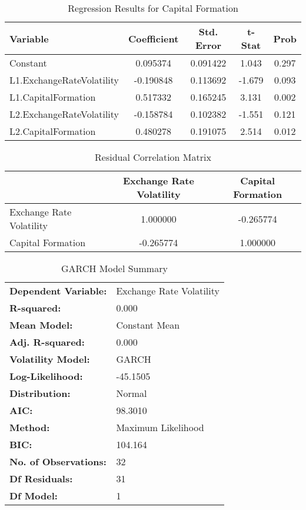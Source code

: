 \documentclass{article} %
\begin{document}
\begin{table}[h]
    \centering
    \caption{Regression Results for Capital Formation}
    \begin{tabular}{lcccc}
        \toprule
        \textbf{Variable} & \textbf{Coefficient} & \textbf{Std. Error} & \textbf{t-Stat} & \textbf{Prob} \\
        \midrule
        Constant & 0.095374 & 0.091422 & 1.043 & 0.297 \\
        L1.ExchangeRateVolatility & -0.190848 & 0.113692 & -1.679 & 0.093 \\
        L1.CapitalFormation & 0.517332 & 0.165245 & 3.131 & 0.002 \\
        L2.ExchangeRateVolatility & -0.158784 & 0.102382 & -1.551 & 0.121 \\
        L2.CapitalFormation & 0.480278 & 0.191075 & 2.514 & 0.012 \\
        \bottomrule
    \end{tabular}
\end{table}


\begin{table}[h]
    \centering
    \caption{Residual Correlation Matrix}
    \begin{tabular}{lcc}
        \toprule
        & \textbf{Exchange Rate Volatility} & \textbf{Capital Formation} \\
        \midrule
        Exchange Rate Volatility & 1.000000 & -0.265774 \\
        Capital Formation & -0.265774 & 1.000000 \\
        \bottomrule
    \end{tabular}
\end{table}

\begin{table}[h]
    \centering
    \caption{GARCH Model Summary}
    \begin{tabular}{ll}
        \toprule
        \textbf{Dependent Variable:} & Exchange Rate Volatility \\
        \textbf{R-squared:}          & 0.000 \\
        \textbf{Mean Model:}         & Constant Mean \\
        \textbf{Adj. R-squared:}     & 0.000 \\
        \textbf{Volatility Model:}   & GARCH \\
        \textbf{Log-Likelihood:}     & -45.1505 \\
        \textbf{Distribution:}       & Normal \\
        \textbf{AIC:}                & 98.3010 \\
        \textbf{Method:}             & Maximum Likelihood \\
        \textbf{BIC:}                & 104.164 \\
        \textbf{No. of Observations:} & 32 \\
        \textbf{Df Residuals:}       & 31 \\
        \textbf{Df Model:}           & 1 \\
        \bottomrule
    \end{tabular}
\end{table}
\end{document}
